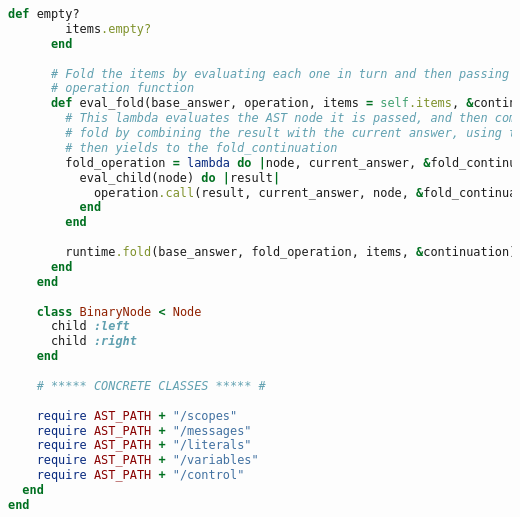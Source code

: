 \begin{lstlisting}[title={\small\ttfamily\bfseries ast/ast.rb},language=Ruby]
      def empty?
        items.empty?
      end
      
      # Fold the items by evaluating each one in turn and then passing the evaluated object to an
      # operation function
      def eval_fold(base_answer, operation, items = self.items, &continuation)
        # This lambda evaluates the AST node it is passed, and then computes the next answer for the
        # fold by combining the result with the current answer, using the operation provided, which
        # then yields to the fold_continuation
        fold_operation = lambda do |node, current_answer, &fold_continuation|
          eval_child(node) do |result|
            operation.call(result, current_answer, node, &fold_continuation)
          end
        end
        
        runtime.fold(base_answer, fold_operation, items, &continuation)
      end
    end
    
    class BinaryNode < Node
      child :left
      child :right
    end
    
    # ***** CONCRETE CLASSES ***** #
    
    require AST_PATH + "/scopes"
    require AST_PATH + "/messages"
    require AST_PATH + "/literals"
    require AST_PATH + "/variables"
    require AST_PATH + "/control"
  end
end

\end{lstlisting}
